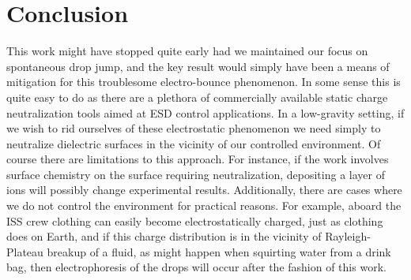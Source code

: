 \documentclass[12pt,a4paper,oneside]{book}
\begin{document}
\section{Conclusion}
This work might have stopped quite early had we maintained our focus on spontaneous drop jump, and the key result would simply have been a means of mitigation for this troublesome electro-bounce phenomenon. In some sense this is quite easy to do as there are a plethora of commercially available static charge neutralization tools aimed at ESD control applications. In a low-gravity setting, if we wish to rid ourselves of these electrostatic phenomenon we need simply to neutralize dielectric surfaces in the vicinity of our controlled environment. Of course there are limitations to this approach. For instance, if the work involves surface chemistry on the surface requiring neutralization, depositing a layer of ions will possibly change experimental results. Additionally, there are cases where we do not control the environment for practical reasons. For example, aboard the ISS crew clothing can easily become electrostatically charged, just as clothing does on Earth, and if this  charge distribution is in the vicinity of Rayleigh-Plateau breakup of a fluid, as might happen when squirting water from a drink bag, then electrophoresis of the drops will occur after the fashion of this work.
\end{document}
